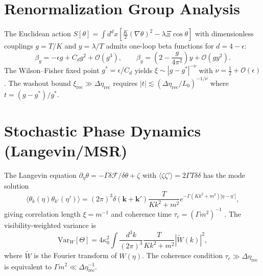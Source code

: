 \documentclass[12pt]{article}
\theoremstyle{definition}
\newcommand{\Wrec}{\Delta\eta_{\mathrm{rec}}}
\newcommand{\xirec}{\xi_{\mathrm{rec}}}
\newcommand{\VarW}{\mathrm{Var}_W}
\begin{document}
\section{Renormalization Group Analysis}
\label{app:RG}

The Euclidean action
$S[\theta]=\int d^dx[\frac{K}{2}(\nabla\theta)^2-\lambda\Xi\cos\theta]$
with dimensionless couplings $g=T/K$ and $y=\lambda/T$ admits
one-loop beta functions for $d=4-\epsilon$:
\begin{equation}
  \beta_g = -\epsilon g + C_d g^2 + \mathcal{O}(g^3),
  \qquad
  \beta_y = \left(2-\frac{g}{4\pi^2}\right)y + \mathcal{O}(gy^2).
\end{equation}
The Wilson--Fisher fixed point $g^\ast=\epsilon/C_d$ yields
$\xi\sim|g-g^\ast|^{-\nu}$ with $\nu=\tfrac{1}{2}+\mathcal{O}(\epsilon)$
\cite{Goldenfeld1992,Zinn-Justin2002,Wilson1974}.
The washout bound $\xirec\gg\Wrec$ requires $|t|\lesssim(\Wrec/L_0)^{-1/\nu}$
where $t=(g-g^\ast)/g^\ast$.

\section{Stochastic Phase Dynamics (Langevin/MSR)}
\label{app:MSR}

The Langevin equation $\partial_\eta\theta=-\Gamma\delta\mathcal{F}/\delta\theta+\zeta$
with $\langle\zeta\zeta'\rangle=2\Gamma T\delta\delta$ has the mode solution
\begin{equation}
  \langle\theta_k(\eta)\theta_{k'}(\eta')\rangle
  = (2\pi)^3\delta(\mathbf{k}+\mathbf{k}')
    \frac{T}{Kk^2+m^2}
    e^{-\Gamma(Kk^2+m^2)|\eta-\eta'|},
\end{equation}
giving correlation length $\xi=m^{-1}$ and coherence time
$\tau_c=(\Gamma m^2)^{-1}$ \cite{Hohenberg1977,Seifert2012}.
The visibility-weighted variance is
\begin{equation}
  \VarW[\Theta]
  = 4\kappa_0^2
    \int\frac{d^3k}{(2\pi)^3}
    \frac{T}{Kk^2+m^2}
    |\widetilde{W}(k)|^2,
\end{equation}
where $\widetilde{W}$ is the Fourier transform of $W(\eta)$.
The coherence condition $\tau_c\gg\Wrec$ is equivalent to
$\Gamma m^2\ll\Wrec^{-1}$.
\end{document}

